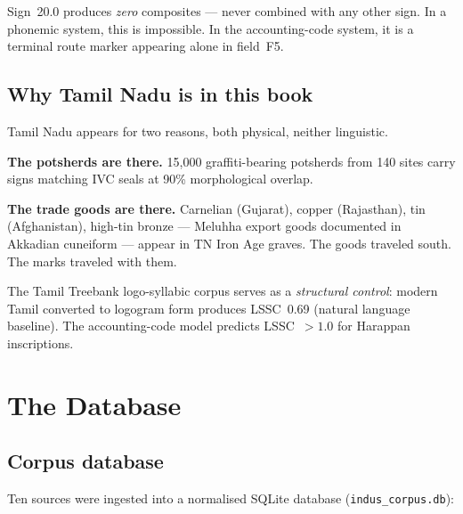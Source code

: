 Sign~20.0 produces \emph{zero} composites --- never combined with
any other sign. In a phonemic system, this is impossible.
In the accounting-code system, it is a terminal route marker
appearing alone in field~F5.

\subsection{Why Tamil Nadu is in this book}

Tamil Nadu appears for two reasons, both physical, neither
linguistic.

\textbf{The potsherds are there.} 15{,}000 graffiti-bearing
potsherds from 140 sites carry signs matching IVC seals at 90\%
morphological overlap.

\textbf{The trade goods are there.} Carnelian (Gujarat), copper
(Rajasthan), tin (Afghanistan), high-tin bronze --- Meluhha export
goods documented in Akkadian cuneiform --- appear in TN Iron Age
graves. The goods traveled south. The marks traveled with them.

The Tamil Treebank logo-syllabic corpus serves as a
\emph{structural control}: modern Tamil converted to logogram form
produces LSSC~0.69 (natural language baseline). The accounting-code
model predicts LSSC~$>1.0$ for Harappan inscriptions.

\section{The Database}

\subsection{Corpus database}

Ten sources were ingested into a normalised SQLite database
(\texttt{indus\_corpus.db}):

